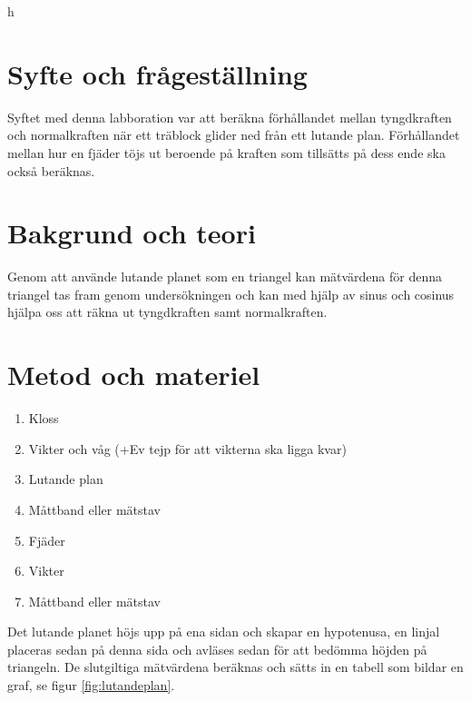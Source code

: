 h\documentclass[11p, titlepage, oneside, a4paper]{article}
\begin{document}
	\newpage

	
	\setlength{\parindent}{0pt}
	\setlength{\parskip}{10pt}
	
	\section{Syfte och frågeställning}
		Syftet med denna labboration var att beräkna förhållandet mellan tyngdkraften och normalkraften när ett träblock glider ned från ett lutande plan. Förhållandet mellan hur en fjäder töjs ut beroende på kraften som tillsätts på dess ende ska också beräknas.

	\section{Bakgrund och teori}
        Genom att använde lutande planet som en triangel kan mätvärdena för denna triangel tas fram genom undersökningen och kan med hjälp av sinus och cosinus hjälpa oss att räkna ut tyngdkraften samt normalkraften.
	

	\section{Metod och materiel}
        \begin{enumerate}
            \item Kloss
            \item Vikter och våg (+Ev tejp för att vikterna ska ligga kvar)
            \item Lutande plan
            \item Måttband eller mätstav
            \item Fjäder
            \item Vikter
            \item Måttband eller mätstav
        \end{enumerate}
        
        Det lutande planet höjs upp på ena sidan och skapar en hypotenusa, en linjal placeras sedan på denna sida och avläses sedan för att bedömma höjden på triangeln. De slutgiltiga mätvärdena beräknas och sätts in en tabell som bildar en graf, se figur \ref{fig:lutandeplan}.
        
\end{document}
